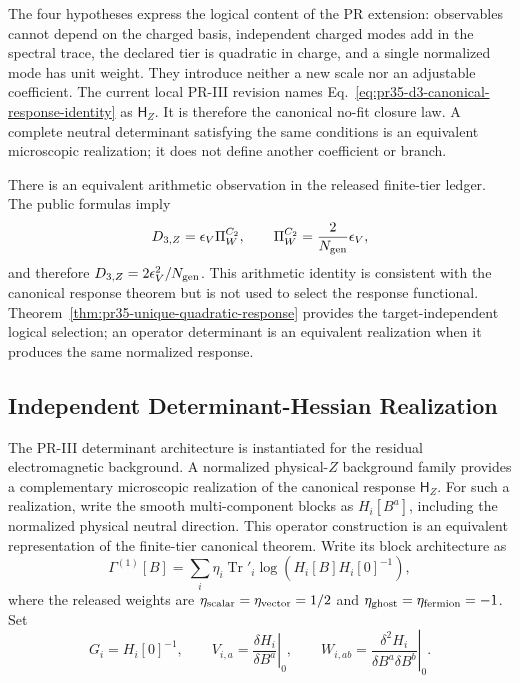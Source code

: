 The four hypotheses express the logical content of the PR extension: observables cannot depend on the charged basis, independent charged modes add in the spectral trace, the declared tier is quadratic in charge, and a single normalized mode has unit weight.  They introduce neither a new scale nor an
adjustable coefficient.  The current local PR-III revision names Eq.~\eqref{eq:pr35-d3-canonical-response-identity} as $\mathsf H_Z$.  It is therefore the canonical no-fit closure law.  A complete neutral determinant satisfying the same conditions is an equivalent microscopic realization; it
does not define another coefficient or branch.

There is an equivalent arithmetic observation in the released finite-tier ledger.  The public formulas imply
\begin{equation}
 D_{3,Z}=\epsilon_V\Pi_W^{C_2},
 \qquad
 \Pi_W^{C_2}=\frac{2}{N_{\rm gen}}\epsilon_V,
 \label{eq:pr35-d3-recurrence-observation}
\end{equation}
and therefore $D_{3,Z}=2\epsilon_V^2/N_{\rm gen}$.  This arithmetic identity is consistent with the canonical response theorem but is not used to select the response functional.  Theorem~\ref{thm:pr35-unique-quadratic-response} provides the target-independent logical selection; an operator determinant is an equivalent realization when it produces the same normalized response.

\subsection{Independent Determinant-Hessian Realization}

The PR-III determinant architecture is instantiated for the residual electromagnetic background.  A normalized physical-$Z$ background family provides a complementary microscopic realization of the canonical response $\mathsf H_Z$.  For such a realization, write the smooth multi-component
blocks as $H_i[B^a]$, including the normalized physical neutral direction. This operator construction is an equivalent representation of the finite-tier canonical theorem.  Write its block architecture as
\begin{equation}
 \Gamma^{(1)}[B]
 =\sum_i\eta_i\operatorname{Tr}'_i
 \log\!\left(H_i[B]H_i[0]^{-1}\right),
 \label{eq:pr35-d3-block-determinant}
\end{equation}
where the released weights are
$\eta_{\rm scalar}=\eta_{\rm vector}=1/2$ and
$\eta_{\rm ghost}=\eta_{\rm fermion}=-1$.  Set
\begin{equation}
 G_i=H_i[0]^{-1},\qquad
 V_{i,a}=\left.\frac{\delta H_i}{\delta B^a}\right|_0,\qquad
 W_{i,ab}=\left.\frac{\delta^2H_i}
 {\delta B^a\delta B^b}\right|_0.
\end{equation}

